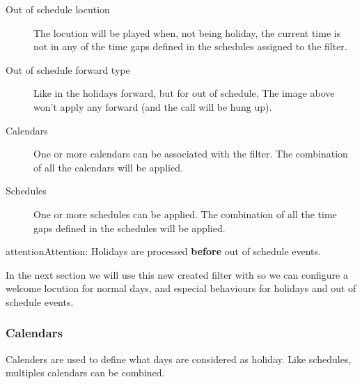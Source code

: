 \documentclass[letterpaper,10pt,english]{sphinxmanual}
\begin{document}
\begin{description}
\item[{Out of schedule locution}] \leavevmode{}\label{administration_portal/client/vpbx/routing_tools/external_call_filters:term-out-of-schedule-locution}
The locution will be played when, not being holiday, the current time
is not in any of the time gaps defined in the schedules assigned to the
filter.

\item[{Out of schedule forward type}] \leavevmode{}\label{administration_portal/client/vpbx/routing_tools/external_call_filters:term-out-of-schedule-forward-type}
Like in the holidays forward, but for out of schedule. The image above
won't apply any forward (and the call will be hung up).

\item[{Calendars}] \leavevmode{}\label{administration_portal/client/vpbx/routing_tools/external_call_filters:term-calendars}
One or more calendars can be associated with the filter. The combination
of all the calendars will be applied.

\item[{Schedules}] \leavevmode{}\label{administration_portal/client/vpbx/routing_tools/external_call_filters:term-schedules}
One or more schedules can be applied. The combination of all the time
gaps defined in the schedules will be applied.

\end{description}

\begin{notice}{attention}{Attention:}
Holidays are processed \textbf{before} out of schedule events.
\end{notice}

In the next section we will use this new created filter with
{\hyperref[administration_portal/client/vpbx/ddis:ddis]{}} so we can configure a welcome locution for normal days,
and especial behaviours for holidays and out of schedule events.


\subsubsection{Calendars}
\label{administration_portal/client/vpbx/routing_tools/calendars:calendars}\label{administration_portal/client/vpbx/routing_tools/calendars::doc}
Calenders are used to define what days are considered as holiday. Like
schedules, multiples calendars can be combined.
\end{document}
